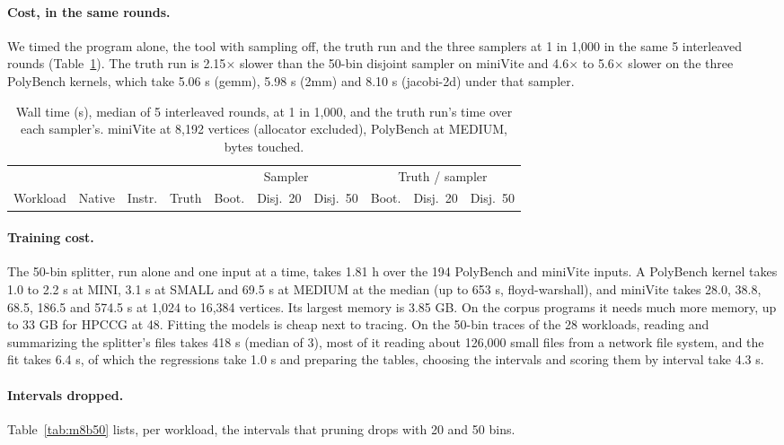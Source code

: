 \documentclass[11pt]{article}
\newcommand{\tabinput}[1]{}
\begin{document}
\paragraph{Cost, in the same rounds.} We timed the program alone, the tool with sampling off, the truth run and the
three samplers at 1 in 1,000 in the same 5 interleaved rounds (Table~\ref{tab:b50cost}). The truth run is
2.15$\times$ slower than the 50-bin disjoint sampler on miniVite and 4.6$\times$ to 5.6$\times$ slower on the three
PolyBench kernels, which take 5.06 s (gemm), 5.98 s (2mm) and 8.10 s (jacobi-2d) under that sampler.

\begin{table}[htbp]
\centering
\caption{Wall time (s), median of 5 interleaved rounds, at 1 in 1,000, and the truth run's time over each sampler's.
miniVite at 8,192 vertices (allocator excluded), PolyBench at MEDIUM, bytes touched.}
\label{tab:b50cost}
\footnotesize
\setlength{\tabcolsep}{4pt}
\begin{tabular}{@{}lrrrrrrrrr@{}}
\toprule
& & & & \multicolumn{3}{c}{Sampler} & \multicolumn{3}{c}{Truth / sampler} \\
\cmidrule(lr){5-7}\cmidrule(l){8-10}
Workload & Native & Instr. & Truth & Boot. & Disj.\ 20 & Disj.\ 50 & Boot. & Disj.\ 20 & Disj.\ 50 \\
\midrule
\tabinput{b50_cost}
\bottomrule
\end{tabular}
\end{table}

\paragraph{Training cost.} The 50-bin splitter, run alone and one input at a time, takes 1.81 h over the 194
PolyBench and miniVite inputs. A PolyBench kernel takes 1.0 to 2.2 s at MINI, 3.1 s at SMALL and 69.5 s at MEDIUM at
the median (up to 653 s, floyd-warshall), and miniVite takes 28.0, 38.8, 68.5, 186.5 and 574.5 s at 1,024 to
16,384 vertices. Its largest memory is 3.85 GB. On the corpus programs it needs much more memory, up to 33 GB for
HPCCG at 48. Fitting the models is cheap next to tracing. On the 50-bin traces of the 28 workloads, reading and
summarizing the splitter's files takes 418 s (median of 3), most of it reading about 126,000 small files from a
network file system, and the fit takes 6.4 s, of which the regressions take 1.0 s and preparing the tables,
choosing the intervals and scoring them by interval take 4.3 s.

\paragraph{Intervals dropped.} Table~\ref{tab:m8b50} lists, per workload, the intervals that pruning drops with 20
and 50 bins.
\end{document}
